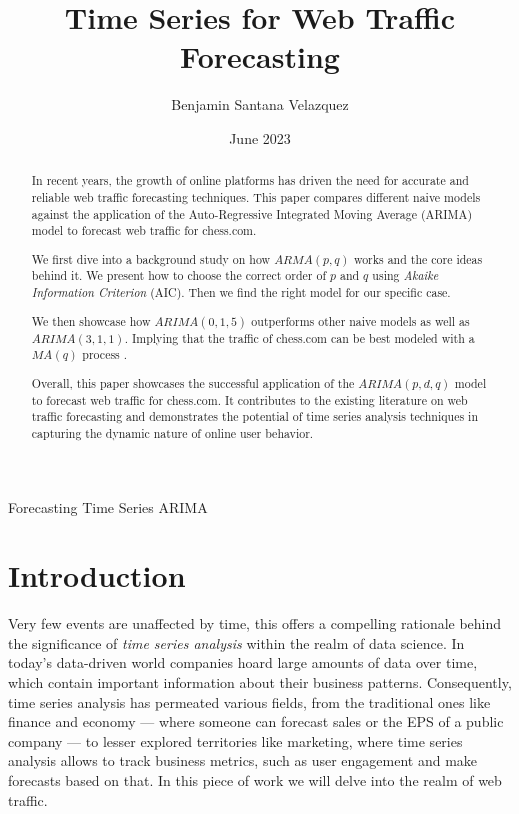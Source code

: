 \documentclass[journal]{IEEEtran}
\title{Time Series for Web Traffic Forecasting}
\author{Benjamin Santana Velazquez}
\date{June 2023}
\begin{document}
\maketitle

\begin{abstract}
    In recent years, the growth of online platforms has driven the need for
    accurate and reliable web traffic forecasting techniques. This paper
    compares different naive models against the application of the
    Auto-Regressive Integrated Moving Average (ARIMA) model to forecast web
    traffic for chess.com.

    We first dive into a background study on how $ARMA(p,q)$ works and the core
    ideas behind it. We present how to choose the correct order of $p$ and $q$
    using \emph{Akaike Information Criterion} (AIC). Then we find the right
    model for our specific case.

    We then showcase how $ARIMA(0,1,5)$ outperforms other naive models as well
    as $ARIMA(3,1,1)$. Implying that the traffic of chess.com can be best
    modeled with a $MA(q)$ process .

    Overall, this paper showcases the successful application of the
    $ARIMA(p,d,q)$ model to forecast web traffic for chess.com. It contributes
    to the existing literature on web traffic forecasting and demonstrates the
    potential of time series analysis techniques in capturing the dynamic
    nature of online user behavior.
\end{abstract}

\begin{IEEEkeywords}
    Forecasting
    Time Series
    ARIMA
\end{IEEEkeywords}

\section{Introduction}\label{sec:intro}
Very few events are unaffected by time, this offers a compelling rationale
behind the significance of \emph{time series analysis} within the
realm of data science. In today's data-driven world companies hoard large
amounts of data over time, which contain important information about their
business patterns. Consequently, time series analysis has permeated various
fields, from the traditional ones like finance and economy --- where someone
can forecast sales or the EPS of a public company --- to lesser explored
territories like marketing, where time series analysis allows to track business
metrics, such as user engagement and make forecasts based on that. In this
piece of work we will delve into the realm of web traffic.
\end{document}
